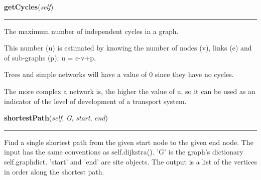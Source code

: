     \label{Epigrass:simobj:graph:getCycles}

    \vspace{0.5ex}

    \begin{boxedminipage}{\textwidth}

    \raggedright \textbf{getCycles}(\textit{self})

    \vspace{-1.5ex}

    \rule{\textwidth}{0.5\fboxrule}
    The maximum number of independent cycles in a graph.

    This number (u) is estimated by knowing the number of nodes (v), links 
    (e) and of sub-graphs (p); u = e-v+p.

    Trees and simple networks will have a value of 0 since they have no 
    cycles.

    The more complex a network is, the higher the value of u, so it can be 
    used as an indicator of the level of development of a transport system.

    \vspace{1ex}

    \end{boxedminipage}

    \label{Epigrass:simobj:graph:shortestPath}

    \vspace{0.5ex}

    \begin{boxedminipage}{\textwidth}

    \raggedright \textbf{shortestPath}(\textit{self}, \textit{G}, \textit{start}, \textit{end})

    \vspace{-1.5ex}

    \rule{\textwidth}{0.5\fboxrule}
    Find a single shortest path from the given start node to the given end 
    node. The input has the same conventions as self.dijkstra(). 'G' is the
    graph's dictionary self.graphdict. 'start' and 'end' are site objects. 
    The output is a list of the vertices in order along the shortest path.

    \vspace{1ex}

    \end{boxedminipage}

